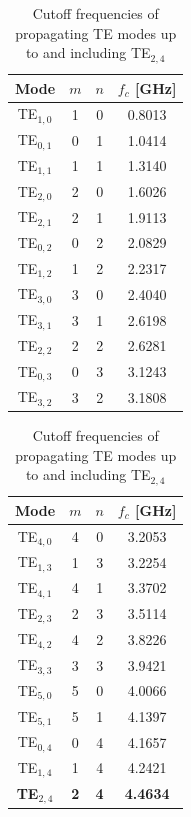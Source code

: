 \documentclass[a4paper,11pt]{article}
\begin{document}
\begin{table}[H]
\centering
\caption{Cutoff frequencies of propagating TE modes up to and including TE$_{2,4}$}
\small
\begin{minipage}[t]{0.49\textwidth}
\centering
\begin{tabular}{cccc}
\toprule
Mode & $m$ & $n$ & $f_c$ [GHz] \\
\midrule
TE$_{1,0}$ & 1 & 0 & 0.8013 \\
TE$_{0,1}$ & 0 & 1 & 1.0414 \\
TE$_{1,1}$ & 1 & 1 & 1.3140 \\
TE$_{2,0}$ & 2 & 0 & 1.6026 \\
TE$_{2,1}$ & 2 & 1 & 1.9113 \\
TE$_{0,2}$ & 0 & 2 & 2.0829 \\
TE$_{1,2}$ & 1 & 2 & 2.2317 \\
TE$_{3,0}$ & 3 & 0 & 2.4040 \\
TE$_{3,1}$ & 3 & 1 & 2.6198 \\
TE$_{2,2}$ & 2 & 2 & 2.6281 \\
TE$_{0,3}$ & 0 & 3 & 3.1243 \\
TE$_{3,2}$ & 3 & 2 & 3.1808 \\
\bottomrule
\end{tabular}
\end{minipage}%
\hfill
\begin{minipage}[t]{0.49\textwidth}
\centering
\begin{tabular}{cccc}
\toprule
Mode & $m$ & $n$ & $f_c$ [GHz] \\
\midrule
TE$_{4,0}$ & 4 & 0 & 3.2053 \\
TE$_{1,3}$ & 1 & 3 & 3.2254 \\
TE$_{4,1}$ & 4 & 1 & 3.3702 \\
TE$_{2,3}$ & 2 & 3 & 3.5114 \\
TE$_{4,2}$ & 4 & 2 & 3.8226 \\
TE$_{3,3}$ & 3 & 3 & 3.9421 \\
TE$_{5,0}$ & 5 & 0 & 4.0066 \\
TE$_{5,1}$ & 5 & 1 & 4.1397 \\
TE$_{0,4}$ & 0 & 4 & 4.1657 \\
TE$_{1,4}$ & 1 & 4 & 4.2421 \\
\textbf{TE$_{2,4}$} & \textbf{2} & \textbf{4} & \textbf{4.4634} \\
\bottomrule
\end{tabular}
\end{minipage}
\end{table}
\end{document}
